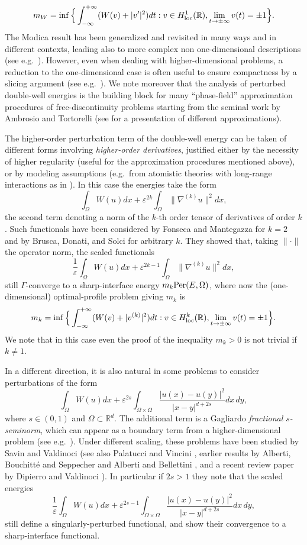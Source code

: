 \documentclass{article}
\newcommand{\e}{\varepsilon}
\begin{document}
$$
m_W=\inf\Big\{\int_{-\infty}^{+\infty}(W(v)+ |v'|^2)dt: v\in H^1_{\rm loc}(\mathbb R),  \lim_{t\to\pm\infty} v(t)=\pm1\Big\}.
$$
The Modica result has been generalized and revisited in many ways and in different contexts, leading also to more complex non one-dimensional descriptions (see e.g.~\cite{MR1051228,MR1286918,MR1036589,MR1097327}). However, even when dealing with higher-dimensional problems, a reduction to the one-dimensional case is often useful to ensure compactness by a slicing argument (see e.g.~\cite{alberti,bln}). We note moreover that the analysis of perturbed double-well energies is the building block for many ``phase-field'' approximation procedures of free-discontinuity problems starting from the seminal work by Ambrosio and Tortorelli \cite{AT} (see \cite{bln} for a presentation of different approximations).

\smallskip
The higher-order perturbation term of the double-well energy can be taken of different forms involving {\em higher-order derivatives}, justified either by the necessity of higher regularity (useful for the approximation procedures mentioned above), or by modeling assumptions (e.g.~from atomistic theories with long-range interactions as in \cite{BCST}). In this case the energies take the form
$$
\int_\Omega W(u)dx+\e^{2k}\int_\Omega\|\nabla^{(k)} u\|^2dx,
$$
the second term denoting a norm of the $k$-th order tensor of derivatives of order $k$. Such functionals have been considered by Fonseca and Mantegazza \cite{FM} for $k=2$ and by Brusca, Donati, and Solci \cite{BDS} for arbitrary $k$. They showed that, taking $\|\cdot\|$ the operator norm, the scaled functionals 
$$
\frac1\e\int_\Omega W(u)dx+\e^{2k-1}\int_\Omega\|\nabla^{(k)} u\|^2dx,
$$
still $\Gamma$-converge to a sharp-interface energy $m_k{\rm Per}(E,\Omega)$, where now the (one-dimensional) optimal-profile problem giving $m_k$ is
\begin{equation}\label{mint-k}
m_k=\inf\Big\{\int_{-\infty}^{+\infty}(W(v)+ |v^{(k)}|^2)dt: v\in H^k_{\rm loc}(\mathbb R),  \lim_{t\to\pm\infty} v(t)=\pm1\Big\}.
\end{equation}
We note that in this case even the proof of the inequality $m_k>0$ is not trivial if $k\neq 1$. 

In a different direction, it is also natural in some problems to consider perturbations of the form 
$$
\int_\Omega W(u)dx+\e^{2s}\int_{\Omega\times\Omega} \frac{|u(x)-u(y)|^2}{|x-y|^{d+2s}} dx\,dy,
$$
where $s\in(0,1)$ and $\Omega\subset \mathbb R^d$. The additional term is a Gagliardo {\em fractional $s$-seminorm}, which can appear as a boundary term from a higher-dimensional problem (see e.g.~\cite{ABS-2}). Under different scaling, these problems have been studied by Savin and Valdinoci \cite{SV} (see also Palatucci and Vincini \cite{PaVi}, earlier results by Alberti, Bouchitt\'e and Seppecher \cite{ABS} and Alberti and Bellettini \cite{AB}, and a recent review paper by Dipierro and Valdinoci \cite{DipVal}). In particular if $2s>1$ they note that the scaled energies
$$
\frac1\e\int_\Omega W(u)dx+\e^{2s-1}\int_{\Omega\times\Omega} \frac{|u(x)-u(y)|^2}{|x-y|^{d+2s}} dx\,dy,
$$
still define a singularly-perturbed functional, and show their convergence to a sharp-interface functional. 
\end{document}
